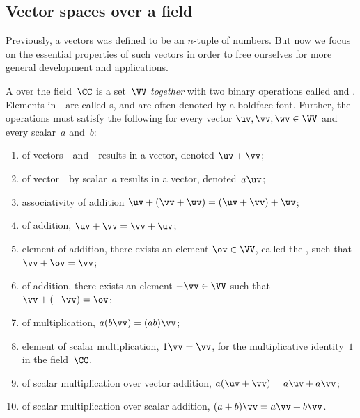 \begin{draft}
\subsection{Vector spaces over a field}

Previously, a vectors was defined to be an \(n\)-tuple of numbers.
But now we focus on the essential properties of such vectors in order to free ourselves for more general development and applications.





\begin{definition} \label{def:vsf}
A  over the field~\(\CC\) is a set~\(\VV\) \emph{together} with two binary operations called  and .
Elements in~\VV\ are called s, and are often denoted by a boldface font.
Further, the operations must satisfy the following for every vector \(\uv,\vv,\wv\in\VV\) and every scalar~\(a\) and~\(b\):
\begin{enumerate}
\item {} of vectors~\uv\ and~\vv\ results in a vector, denoted \(\uv+\vv\);
\item {} of vector~\uv\ by scalar~\(a\) results in a vector, denoted~\(a\uv\);
\item associativity of addition 	\(\uv + (\vv + \wv) = (\uv + \vv) + \wv\);
\item {} of addition, \(\uv + \vv = \vv + \uv\);
\item {} element of addition, there exists an element \(\ov\in\VV\), called the , such that \(\vv + \ov = \vv\);
\item {} of addition, there exists an element \(-\vv\in\VV\)  such that \(\vv + (-\vv) = \ov\);
\item {} of multiplication, 	\(a(b\vv) = (ab)\vv\);
\item {} element of scalar multiplication, \(1\vv = \vv\), for the multiplicative identity~\(1\) in the field~\(\CC\).
\item {} of scalar multiplication over vector addition, \(a(\uv + \vv) = a\uv + a\vv\);
\item {} of scalar multiplication over scalar addition, \((a + b)\vv = a\vv + b\vv\).
\end{enumerate}
\end{definition}





\end{draft}
